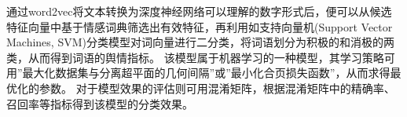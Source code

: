 \documentclass[]{SASSTeX}
\begin{document}
通过word2vec将文本转换为深度神经网络可以理解的数字形式后，便可以从候选特征向量中基于情感词典筛选出有效特征，再利用如支持向量机(Support Vector Machines, SVM)分类模型对词向量进行二分类，将词语划分为积极的和消极的两类，从而得到词语的舆情指标\cite{张冬雯2016基于}。
该模型属于机器学习的一种模型，其学习策略可用”最大化数据集与分离超平面的几何间隔”或”最小化合页损失函数”，从而求得最优化的参数。
对于模型效果的评估则可用混淆矩阵，根据混淆矩阵中的精确率、召回率等指标得到该模型的分类效果。



\end{document}
